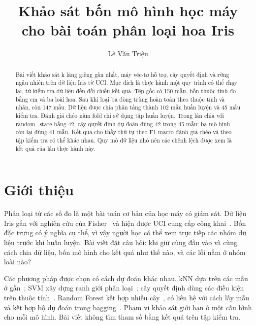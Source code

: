 \documentclass[runningheads]{llncs}
\begin{document}
\title{Khảo sát bốn mô hình học máy cho bài toán phân loại hoa Iris}
\author{Lê Văn Triệu}
\maketitle
\begin{abstract}
Bài viết khảo sát k láng giềng gần nhất, máy véc-tơ hỗ trợ, cây quyết định và rừng ngẫu nhiên trên dữ liệu Iris từ UCI. Mục đích là thực hành một quy trình có thể chạy lại, từ kiểm tra dữ liệu đến đối chiếu kết quả. Tệp gốc có 150 mẫu, bốn thuộc tính đo bằng cm và ba loài hoa. Sau khi loại ba dòng trùng hoàn toàn theo thuộc tính và nhãn, còn 147 mẫu. Dữ liệu được chia phân tầng thành 102 mẫu huấn luyện và 45 mẫu kiểm tra. Đánh giá chéo năm fold chỉ sử dụng tập huấn luyện. Trong lần chia với random\_state bằng 42, cây quyết định dự đoán đúng 42 trong 45 mẫu; ba mô hình còn lại đúng 41 mẫu. Kết quả cho thấy thứ tự theo F1 macro đánh giá chéo và theo tập kiểm tra có thể khác nhau. Quy mô dữ liệu nhỏ nên các chênh lệch được xem là kết quả của lần thực hành này.
\end{abstract}

\section{Giới thiệu}
Phân loại từ các số đo là một bài toán cơ bản của học máy có giám sát. Dữ liệu Iris gắn với nghiên cứu của Fisher~\cite{fisher} và hiện được UCI cung cấp công khai~\cite{iris}. Bốn đặc trưng có ý nghĩa cụ thể, vì vậy người học có thể xem trực tiếp các nhóm dữ liệu trước khi huấn luyện. Bài viết đặt câu hỏi: khi giữ cùng đầu vào và cùng cách chia dữ liệu, bốn mô hình cho kết quả như thế nào, và các lỗi nằm ở nhóm loài nào?

Các phương pháp được chọn có cách dự đoán khác nhau. kNN dựa trên các mẫu ở gần~\cite{cover}; SVM xây dựng ranh giới phân loại~\cite{cortes}; cây quyết định dùng các điều kiện trên thuộc tính~\cite{cart}. Random Forest kết hợp nhiều cây~\cite{breiman}, có liên hệ với cách lấy mẫu và kết hợp bộ dự đoán trong bagging~\cite{bagging}. Phạm vi khảo sát giới hạn ở một cấu hình cho mỗi mô hình. Bài viết không tìm tham số bằng kết quả trên tập kiểm tra.
\end{document}
